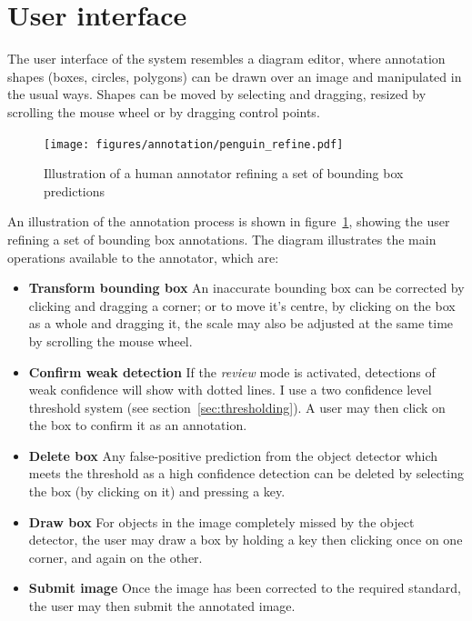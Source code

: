 \section {User interface}

The user interface of the system resembles a diagram editor, where annotation shapes (boxes, circles, polygons) can be drawn over an image and manipulated in the usual ways. Shapes can be moved by selecting and dragging, resized by scrolling the mouse wheel or by dragging control points. 

\begin{figure}[h!]
  \centering
  \texttt{[image: figures/annotation/penguin\_refine.pdf]}
  \caption{Illustration of a human annotator refining a set of bounding box predictions }   
  \label{fig:penguin_refinement}
\end{figure}

An illustration of the annotation process is shown in figure~\ref{fig:penguin_refinement}, showing the user refining a set of bounding box annotations. The diagram illustrates the main operations available to the annotator, which are:

\begin{itemize}
    \item {\bf Transform bounding box}
An inaccurate bounding box can be corrected by clicking and dragging a corner; or to move it's centre, by clicking on the box as a whole and dragging it, the scale may also be adjusted at the same time by scrolling the mouse wheel.
    \item {\bf Confirm weak detection}
If the \emph{review} mode is activated, detections of weak confidence will show with dotted lines. I use a two confidence level threshold system (see section~\ref{sec:thresholding}). A user may then click on the box to confirm it as an annotation.
    \item {\bf Delete box}
Any false-positive prediction from the object detector which meets the threshold as a high confidence detection can be deleted by selecting the box (by clicking on it) and pressing a key. 
    \item {\bf Draw box}
For objects in the image completely missed by the object detector, the user may draw a box by holding a key then clicking once on one corner, and again on the other.
    \item {\bf Submit image}
Once the image has been corrected to the required standard, the user may then submit the annotated image.
\end{itemize}

